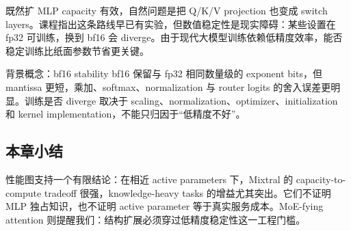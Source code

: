 既然扩 MLP capacity 有效，自然问题是把 Q/K/V projection 也变成 switch layers。课程指出这条路线早已有实验，但数值稳定性是现实障碍：某些设置在 fp32 可训练，换到 bf16 会 diverge。由于现代大模型训练依赖低精度效率，能否稳定训练比纸面参数节省更关键。


\begin{knowledgebox}{背景概念：bf16 stability}
bf16 保留与 fp32 相同数量级的 exponent bits，但 mantissa 更短，乘加、softmax、normalization 与 router logits 的舍入误差更明显。训练是否 diverge 取决于 scaling、normalization、optimizer、initialization 和 kernel implementation，不能只归因于“低精度不好”。
\end{knowledgebox}


\subsection{本章小结}

性能图支持一个有限结论：在相近 active parameters 下，Mixtral 的 capacity-to-compute tradeoff 很强，knowledge-heavy tasks 的增益尤其突出。它们不证明 MLP 独占知识，也不证明 active parameter 等于真实服务成本。MoE-fying attention 则提醒我们：结构扩展必须穿过低精度稳定性这一工程门槛。

